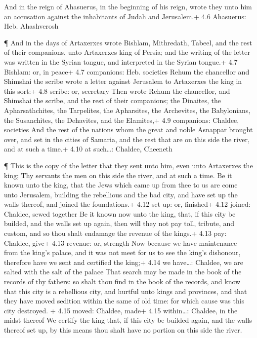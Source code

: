  And in the reign of Ahasuerus, in the beginning of his
reign, wrote they unto him an accusation against the inhabitants of
Judah and Jerusalem.+ 4.6 Ahasuerus: Heb. Ahashverosh

 ¶ And in the days of Artaxerxes wrote Bishlam, Mithredath,
Tabeel, and the rest of their companions, unto Artaxerxes king of
Persia; and the writing of the letter was written in the Syrian tongue,
and interpreted in the Syrian tongue.+ 4.7 Bishlam: or, in peace+ 4.7
companions: Heb. societies  Rehum the chancellor and
Shimshai the scribe wrote a letter against Jerusalem to Artaxerxes the
king in this sort:+ 4.8 scribe: or, secretary  Then wrote
Rehum the chancellor, and Shimshai the scribe, and the rest of their
companions; the Dinaites, the Apharsathchites, the Tarpelites, the
Apharsites, the Archevites, the Babylonians, the Susanchites, the
Dehavites, and the Elamites,+ 4.9 companions: Chaldee, societies
 And the rest of the nations whom the great and noble
Asnappar brought over, and set in the cities of Samaria, and the rest
that are on this side the river, and at such a time.+ 4.10 at
such\ldots: Chaldee, Cheeneth

 ¶ This is the copy of the letter that they sent unto him,
even unto Artaxerxes the king; Thy servants the men on this side the
river, and at such a time.  Be it known unto the king, that
the Jews which came up from thee to us are come unto Jerusalem, building
the rebellious and the bad city, and have set up the walls thereof, and
joined the foundations.+ 4.12 set up: or, finished+ 4.12 joined:
Chaldee, sewed together  Be it known now unto the king,
that, if this city be builded, and the walls set up again, then will
they not pay toll, tribute, and custom, and so thou shalt endamage the
revenue of the kings.+ 4.13 pay: Chaldee, give+ 4.13 revenue: or,
strength  Now because we have maintenance from the king's
palace, and it was not meet for us to see the king's dishonour,
therefore have we sent and certified the king;+ 4.14 we have\ldots:
Chaldee, we are salted with the salt of the palace  That
search may be made in the book of the records of thy fathers: so shalt
thou find in the book of the records, and know that this city is a
rebellious city, and hurtful unto kings and provinces, and that they
have moved sedition within the same of old time: for which cause was
this city destroyed. + 4.15 moved: Chaldee, made+ 4.15 within\ldots:
Chaldee, in the midst thereof  We certify the king that, if
this city be builded again, and the walls thereof set up, by this means
thou shalt have no portion on this side the river.

